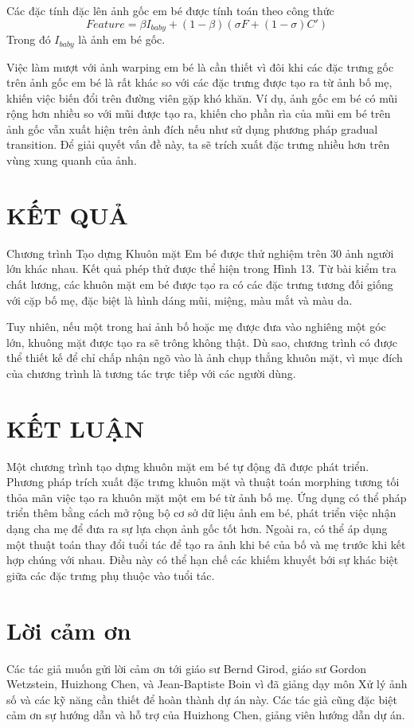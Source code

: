 \documentclass[conference]{IEEEtran}
\begin{document}
Các đặc tính đặc lên ảnh gốc em bé được tính toán theo công thức \[Feature = \beta I_{baby}+(1 - \beta )(\sigma F+(1-\sigma )C')\]
Trong đó $I_{baby}$ là ảnh em bé gốc.

Việc làm mượt với ảnh warping em bé là cần thiết vì đôi khi các đặc trưng gốc trên ảnh gốc em bé là rất khác so với các đặc trưng được tạo ra từ ảnh bố mẹ, khiến việc biến đổi trên đường viên gặp khó khăn. Ví dụ, ảnh gốc em bé có mũi rộng hơn nhiều so với mũi được tạo ra, khiến cho phần rìa của mũi em bé trên ảnh gốc vẫn xuất hiện trên ảnh đích nếu như sử dụng phương pháp gradual transition. Để giải quyết vấn đề này, ta sẽ trích xuất đặc trưng nhiều hơn trên vùng xung quanh của ảnh.


\section{KẾT QUẢ}
Chương trình Tạo dựng Khuôn mặt Em bé được thử nghiệm trên 30 ảnh người lớn khác nhau. Kết quả phép thử được thể hiện trong Hình 13. Từ bài kiểm tra chất lương, các khuôn mặt em bé được tạo ra có các đặc trưng tương đối giống với cặp bố mẹ, đặc biệt là hình dáng mũi, miệng, màu mắt và màu da.

Tuy nhiên, nếu một trong hai ảnh bố hoặc mẹ được đưa vào nghiêng một góc lớn, khuông mặt được tạo ra sẽ trông không thật. Dù sao, chương trình có được thể thiết kế để chỉ chấp nhận ngõ vào là ảnh chụp thẳng khuôn mặt, vì mục đích của chương trình là tương tác trực tiếp với các người dùng.


\section{KẾT LUẬN}
Một chương trình tạo dựng khuôn mặt em bé tự động đã được phát triển. Phương pháp trích xuất đặc trưng khuôn mặt và thuật toán morphing tương tối thỏa mãn việc tạo ra khuôn mặt một em bé từ ảnh bố mẹ. Ứng dụng có thể pháp triển thêm bằng cách mở rộng bộ cơ sở dữ liệu ảnh em bé, phát triển việc nhận dạng cha mẹ để đưa ra sự lựa chọn ảnh gốc tốt hơn. Ngoài ra, có thể áp dụng một thuật toán thay đổi tuổi tác để tạo ra ảnh khi bé của bố và mẹ trước khi kết hợp chúng với nhau. Điều này có thể hạn chế các khiếm khuyết bới sự khác biệt giữa các đặc trưng phụ thuộc vào tuổi tác.

\section*{Lời cảm ơn}
Các tác giả muốn gửi lời cảm ơn tới giáo sư Bernd Girod, giáo sư Gordon Wetzstein, Huizhong Chen, và Jean-Baptiste Boin vì đã giảng dạy môn Xử lý ảnh số và các kỹ năng cần thiết để hoàn thành dự án này. Các tác giả cũng đặc biệt cảm ơn sự hướng dẫn và hỗ trợ của Huizhong Chen, giảng viên hướng dẫn dự án.
\end{document}
